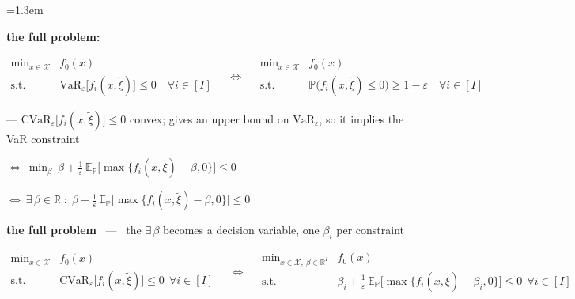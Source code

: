 \documentclass[10pt]{article}
\newenvironment{board}{%
  \par\vspace{4pt}
  \begingroup\leftskip=1.3em\relax\parskip=2pt\relax}{%
  \par\endgroup\vspace{4pt}}
\newcommand{\E}{\mathbb{E}}
\newcommand{\Prob}{\mathbb{P}}
\newcommand{\VaR}{\mathrm{VaR}}
\newcommand{\CVaR}{\mathrm{CVaR}}
\newcommand{\xit}{\tilde\xi}
\begin{document}
\begin{board}
\begin{minipage}{\dimexpr\linewidth-1.3em\relax}
\quad \textbf{the full problem:}
\vspace{2pt}

\begin{center}
\mbox{$\begin{array}{rl}
  \displaystyle\min_{x \in \mathcal{X}} & f_0(x) \\[6pt]
  \text{s.t.} & \VaR_{\varepsilon}\big[f_i(x, \xit)\big] \le 0 \quad \forall i \in [I]
\end{array}
\quad\iff\quad
\begin{array}{rl}
  \displaystyle\min_{x \in \mathcal{X}} & f_0(x) \\[6pt]
  \text{s.t.} & \Prob\big(f_i(x, \xit) \le 0\big) \ge 1 - \varepsilon \quad \forall i \in [I]
\end{array}$}
\end{center}
\end{minipage}
\vspace{6pt}

\quad --- $\CVaR_{\varepsilon}\big[f_i(x, \xit)\big] \le 0$
\qquad convex; gives an upper bound on $\VaR_{\varepsilon}$, so it implies the VaR constraint
\vspace{3pt}

\qquad $\displaystyle \iff\ \min_{\beta}\ \beta + \frac{1}{\varepsilon}\,\E_{\Prob}\big[\max\{f_i(x, \xit) - \beta, 0\}\big] \le 0$
\vspace{3pt}

\qquad $\displaystyle \iff\ \exists\, \beta \in \mathbb{R} \;:\; \beta + \frac{1}{\varepsilon}\,\E_{\Prob}\big[\max\{f_i(x, \xit) - \beta, 0\}\big] \le 0$
\vspace{6pt}

\begin{minipage}{\dimexpr\linewidth-1.3em\relax}
\quad \textbf{the full problem} \ --- \ the $\exists\, \beta$ becomes a decision variable, one $\beta_i$ per constraint
\vspace{2pt}

\begin{center}
\mbox{$\begin{array}{rl}
  \displaystyle\min_{x \in \mathcal{X}} & f_0(x) \\[6pt]
  \text{s.t.} & \CVaR_{\varepsilon}\big[f_i(x, \xit)\big] \le 0 \ \ \forall i \in [I]
\end{array}
\quad\iff\quad
\begin{array}{rl}
  \displaystyle\min_{x \in \mathcal{X},\ \beta \in \mathbb{R}^I} & f_0(x) \\[6pt]
  \text{s.t.} & \displaystyle \beta_i + \frac{1}{\varepsilon}\,\E_{\Prob}\big[\max\{f_i(x, \xit) - \beta_i, 0\}\big] \le 0 \ \ \forall i \in [I]
\end{array}$}
\end{center}
\end{minipage}
\vspace{10pt}


\end{board}
\end{document}
